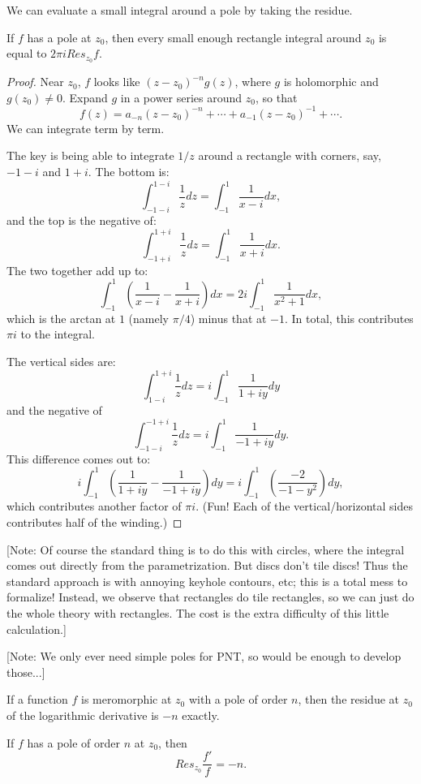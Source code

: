 We can evaluate a small integral around a pole by taking the residue.
\begin{theorem}\label{ResidueTheoremOnRectangle}
If $f$ has a pole at $z_0$, then every small enough rectangle integral around $z_0$ is equal to $2\pi i Res_{z_0} f$.
\end{theorem}



\begin{proof}
Near $z_0$, $f$ looks like $(z-z_0)^{-n} g(z)$, where $g$ is holomorphic and $g(z_0) \neq 0$.
Expand $g$ in a power series around $z_0$, so that
$$
f(z) = a_{-n}(z-z_0)^{-n} + \cdots + a_{-1}(z-z_0)^{-1} + \cdots.
$$
We can integrate term by term.

The key is being able to integrate $1/z$ around a rectangle with corners, say, $-1-i$ and $1+i$. The bottom is:
$$
\int_{-1-i}^{1-i} \frac1z dz
=
\int_{-1}^1 \frac1{x-i} dx,
$$
and the top is the negative of:
$$
\int_{-1+i}^{1+i} \frac1z dz
=
\int_{-1}^1 \frac1{x+i} dx.
$$
The two together add up to:
$$
\int_{-1}^1
\left(\frac1{x-i}-\frac1{x+i} \right)dx
=
2i\int_{-1}^1
\frac{1}{x^2+1}dx,
$$
which is the arctan at $1$ (namely $\pi/4$) minus that at $-1$. In total, this contributes $\pi i$ to the integral.

The vertical sides are:
$$
\int_{1-i}^{1+i} \frac1z dz
=
i\int_{-1}^1 \frac1{1+iy} dy
$$
and the negative of
$$
\int_{-1-i}^{-1+i} \frac1z dz
=
i\int_{-1}^1 \frac1{-1+iy} dy.
$$
This difference comes out to:
$$
i\int_{-1}^1 \left(\frac1{1+iy}-\frac1{-1+iy}\right) dy
=
i\int_{-1}^1 \left(\frac{-2}{-1-y^2}\right) dy,
$$
which contributes another factor of $\pi i$. (Fun! Each of the vertical/horizontal sides contributes half of the winding.)
\end{proof}

[Note: Of course the standard thing is to do this with circles, where the integral comes out directly from the parametrization. But discs don't tile
discs! Thus the standard approach is with annoying keyhole contours, etc; this is a total mess to formalize! Instead, we observe that rectangles do tile rectangles, so we can just do the
whole theory with rectangles. The cost is the extra difficulty of this little calculation.]

[Note: We only ever need simple poles for PNT, so would be enough to develop those...]



If a function $f$ is meromorphic at $z_0$ with a pole of order $n$, then
the residue at $z_0$ of the logarithmic derivative is $-n$ exactly.
\begin{theorem}\label{ResidueOfLogDerivative}
If $f$ has a pole of order $n$ at $z_0$, then
$$
Res_{z_0} \frac{f'}f = -n.
$$
\end{theorem}



